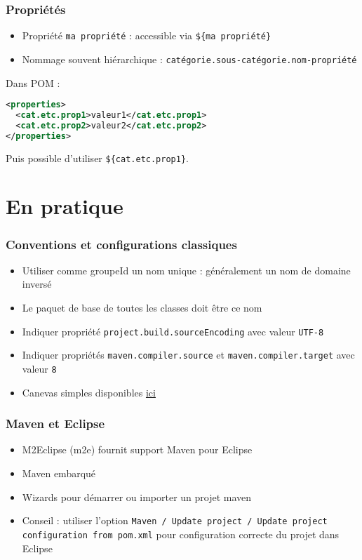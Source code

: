 \documentclass[english, french]{beamer}
\begin{document}
\begin{frame}[fragile]
	\frametitle{Propriétés}
	\begin{itemize}
		\item Propriété \texttt{ma propriété} : accessible via \texttt{\$\{ma propriété\}}
		\item Nommage souvent hiérarchique : \texttt{catégorie.sous-catégorie.nom-propriété}
	\end{itemize}
	Dans POM : 
	\begin{lstlisting}[keywordstyle=\fontspec{Latin Modern Mono Light}\textbf, emph={project, modelVersion, groupId, artifactId, version}, emphstyle=\fontspec{Latin Modern Mono Light}\textbf, language=XML, basicstyle=\small\NoAutoSpacing\ttfamily, showstringspaces=false]
<properties>
  <cat.etc.prop1>valeur1</cat.etc.prop1>
  <cat.etc.prop2>valeur2</cat.etc.prop2>
</properties>
\end{lstlisting}
	
	Puis possible d’utiliser \texttt{\$\{cat.etc.prop1\}}.
\end{frame}

\section{En pratique}
\begin{frame}
	\frametitle{Conventions et configurations classiques}
	\begin{itemize}
		\item Utiliser comme groupeId un nom unique : généralement un nom de domaine inversé
		\item Le paquet de base de toutes les classes doit être ce nom
		\item Indiquer propriété \texttt{project.build.sourceEncoding} avec valeur \texttt{UTF-8}
		\item Indiquer propriétés \texttt{maven.compiler.source} et \texttt{maven.compiler.target} avec valeur \texttt{8}
		\item Canevas simples disponibles \href{https://github.com/oliviercailloux/samples}{ici}
	\end{itemize}
\end{frame}

\begin{frame}
	\frametitle{Maven et Eclipse}
	\begin{itemize}
		\item M2Eclipse (m2e) fournit support Maven pour Eclipse
		\item Maven embarqué
		\item Wizards pour démarrer ou importer un projet maven
		\item Conseil : utiliser l’option \texttt{Maven / Update project / Update project configuration from pom.xml} pour configuration correcte du projet dans Eclipse
	\end{itemize}
\end{frame}
\end{document}
